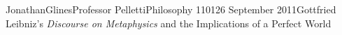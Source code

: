 \documentclass[12pt,letterpaper]{article}
\begin{document}
\begin{mla}{Jonathan}{Glines}{Professor Pelletti}{Philosophy 1101}{26 September 2011}{Gottfried Leibniz's \textit{Discourse on Metaphysics} and the Implications of a Perfect World}

%


\end{mla}
\end{document}
